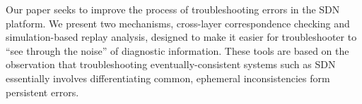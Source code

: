 Our paper seeks to improve the process of troubleshooting errors in the SDN
platform. We present two mechanisms, cross-layer correspondence checking
and simulation-based replay analysis, 
designed to make it easier for troubleshooter to ``see through the noise'' of
diagnostic information. These tools are based on the observation that 
troubleshooting eventually-consistent systems such as SDN essentially
involves differentiating common, ephemeral inconsistencies form persistent
errors. 
